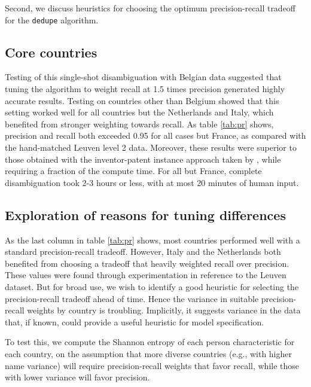 \documentclass[11pt]{article}
\begin{document}
Second, we discuss heuristics for choosing the optimum
precision-recall tradeoff for the \texttt{dedupe} algorithm. 

\subsection{Core countries}
\label{sec:core-countries}

Testing of this single-shot disambiguation with Belgian data suggested
that tuning the algorithm to weight recall at 1.5 times precision
generated highly accurate results. Testing on countries other than
Belgium showed that this setting worked well for all countries but the
Netherlands and Italy, which benefited from stronger weighting towards
recall. As table \ref{tab:pr} shows, precision and recall both
exceeded 0.95 for all cases but France, as compared with the
hand-matched Leuven level 2 data. Moreover, these results were
superior to those obtained with the inventor-patent instance approach
taken by \cite{lai2011disambiguation}, while requiring a fraction of
the compute time. For all but France, complete disambiguation took 2-3
hours or less, with at most 20 minutes of human input.

\subsection{Exploration of reasons for tuning differences}
\label{sec:expl-reas-tuning}

As the last column in table \ref{tab:pr} shows, most countries
performed well with a standard precision-recall tradeoff. However,
Italy and the Netherlands both benefited from choosing a tradeoff that
heavily weighted recall over precision. These values were found
through experimentation in reference to the Leuven dataset. But for
broad use, we wish to identify a good heuristic for selecting the
precision-recall tradeoff ahead of time. Hence the variance in
suitable precision-recall weights by country is troubling. Implicitly,
it suggests variance in the data that, if known, could provide a
useful heuristic for model specification.

To test this, we compute the Shannon entropy of each person characteristic
for each country, on the assumption that more diverse countries (e.g.,
with higher name variance) will require precision-recall weights that
favor recall, while those with lower variance will favor precision. 

\end{document}
